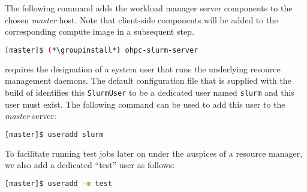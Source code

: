 The following command adds the \SLURM{} workload manager server components to the
chosen {\em master} host. Note that client-side components will be added to
the corresponding compute image in a subsequent step.

\begin{lstlisting}[language=bash,keywords={}]
[master]$ (*\groupinstall*) ohpc-slurm-server
\end{lstlisting}

\SLURM{} requires the designation of a system user that runs the underlying
resource management daemons. The default configuration file that is supplied
with the \OHPC{} build of \SLURM{} identifies this \texttt{SlurmUser} to be a
dedicated user named \texttt{slurm} and this user must exist. 
The following command can be used to add this user to the {\em
  master} server:

\begin{lstlisting}[language=bash,keywords={}]
[master]$ useradd slurm
\end{lstlisting}

To facilitate running test jobs later on under the auspices of a resource
manager, we also add a dedicated ``test'' user as follows:

\begin{lstlisting}[language=bash,keywords={}]
[master]$ useradd -m test
\end{lstlisting}


